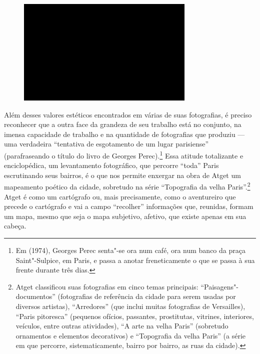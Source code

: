 \begin{figure}[!ht]
\centering
 \includegraphics[width=85mm]{./imgs/im1.jpg}
\caption{\tiny{}}
\end{figure}

Além desses valores estéticos encontrados em várias de suas fotografias,
é preciso reconhecer que a outra face da grandeza de seu trabalho está
no conjunto, na imensa capacidade de trabalho e na quantidade de
fotografias que produziu --- uma verdadeira ``tentativa de esgotamento de
um lugar parisiense'' (parafraseando o título do livro de Georges
Perec).\footnote{Em {} (1974), Georges Perec senta"-se ora num café, ora num
  banco da praça Saint"-Sulpice, em Paris, e passa a anotar
  freneticamente {} o que se passa à sua frente durante três
  dias.} Essa atitude totalizante e enciclopédica, um levantamento
fotográfico, que percorre ``toda'' Paris escrutinando seus bairros, é o
que nos permite enxergar na obra de Atget um mapeamento poético da
cidade, sobretudo na série ``Topografia da velha Paris''.\footnote{Atget
  classificou suas fotografias em cinco temas principais:
  ``Paisagens"-documentos'' (fotografias de referência da cidade para
  serem usadas por diversos artistas), ``Arredores'' (que inclui muitas
  fotografias de Versailles), ``Paris pitoresca'' (pequenos ofícios,
  passantes, prostitutas, vitrines, interiores, veículos, entre outras
  atividades), ``A arte na velha Paris'' (sobretudo ornamentos e
  elementos decorativos) e ``Topografia da velha Paris'' (a série em que
  percorre, sistematicamente, bairro por bairro, as ruas da cidade).}
Atget é como um cartógrafo ou, mais precisamente, como o aventureiro que
precede o cartógrafo e vai a campo ``recolher'' informações que,
reunidas, formam um mapa, mesmo que seja o mapa subjetivo, afetivo, que
existe apenas em sua cabeça.

